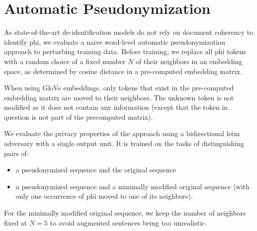 
\section{Automatic Pseudonymization}\label{sec:automatic-pseudonymization}
%
As state-of-the-art de-identification models do not rely on document coherency to identify \ac{phi}, we evaluate a naive word-level automatic pseudonymization approach to perturbing training data.
%
Before training, we replace all \ac{phi} tokens with a random choice of a fixed number $N$ of their neighbors in an embedding space, as determined by cosine distance in a pre-computed embedding matrix.

%
When using GloVe embeddings, only tokens that exist in the pre-computed embedding matrix are moved to their neighbors.
%
The unknown token is not modified as it does not contain any information (except that the token in question is not part of the precomputed matrix).

%
We evaluate the privacy properties of the approach using a bidirectional \ac{lstm} adversary with a single output unit.
%
It is trained on the tasks of distinguishing pairs of:
\begin{itemize}
    \item a pseudonymized sequence and the original sequence
    \item a pseudonymized sequence and a minimally modified original sequence (with only one occurrence of \ac{phi} moved to one of its neighbors).
\end{itemize}
%
For the minimally modified original sequence, we keep the number of neighbors fixed at $N=5$ to avoid augmented sentences being too unrealistic.
